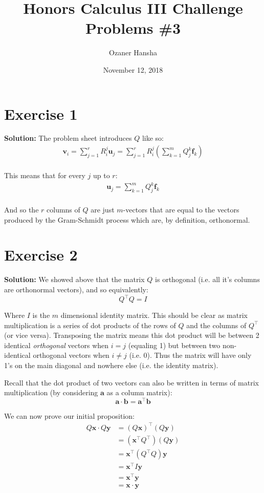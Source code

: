 \documentclass{article}
\newcommand{\mbf}[1]{\mathbf #1}
\begin{document}
\title{Honors Calculus III Challenge Problems \#3}
\author{Ozaner Hansha}
\date{November 12, 2018}
\maketitle

\section*{Exercise 1}
\textbf{Solution:} The problem sheet introduces $Q$ like so:
\begin{align*}
  \mbf v_i=\sum_{j=1}^rR^j_i\mbf u_j=\sum_{j=1}^rR^j_i(\sum_{k=1}^mQ^k_j\mbf f_k)\\
\end{align*}

This means that for every $j$ up to $r$:
\begin{align*}
  \mbf u_j=\sum_{k=1}^mQ^k_j\mbf f_k\\
\end{align*}

And so the $r$ columns of $Q$ are just $m$-vectors that are equal to the vectors produced by the Gram-Schmidt process which are, by definition, orthonormal.

\section*{Exercise 2}
\textbf{Solution:} We showed above that the matrix $Q$ is orthogonal (i.e. all it's columns are orthonormal vectors), and so equivalently:
$$Q^\top Q=I$$

Where $I$ is the $m$ dimensional identity matrix. This should be clear as matrix multiplication is a series of dot products of the rows of $Q$ and the columns of $Q^\top$ (or vice versa). Transposing the matrix means this dot product will be between 2 identical \textit{orthogonal} vectors when $i=j$ (equaling 1) but between two non-identical orthogonal vectors when $i\not=j$ (i.e. 0). Thus the matrix will have only 1's on the main diagonal and nowhere else (i.e. the identity matrix).

Recall that the dot product of two vectors can also be written in terms of matrix multiplication (by considering $\mbf a$ as a column matrix):
$$\mbf a\cdot\mbf b=\mbf a^\top\mbf b$$

We can now prove our initial proposition:
\begin{align*}
  Q\mbf x\cdot Q\mbf y&=(Q\mbf x)^\top(Q\mbf y)\tag{dot product is matrix mult.}\\
  &=(\mbf x^\top Q^\top)(Q\mbf y)\tag{anti-distributivity of transpose}\\
  &=\mbf x^\top (Q^\top Q)\mbf y\tag{associativity of matrix mult.}\\
  &=\mbf x^\top I\mbf y\tag{def. of orthogonal matrix}\\
  &=\mbf x^\top\mbf y\tag{def. identity matrix}\\
  &=\mbf x\cdot\mbf y\tag{dot product is matrix mult.}\\
\end{align*}
\end{document}
